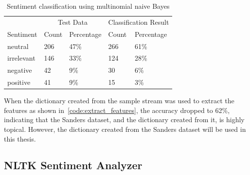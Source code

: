 \begin{table}
    \caption{Sentiment classification using multinomial naive Bayes}
    \label{tab:naive_bayes_results}
    \centering
    \begin{tabular}{lllll} %
        \toprule
        & \multicolumn{2}{c}{Test Data} & \multicolumn{2}{c}{Classification Result}\\
        \cmidrule{2-3}
        \cmidrule{4-5}
        Sentiment
        & Count
        & Percentage
        & Count
        & Percentage
        \\\midrule
        neutral & 206 & 47\%  & 266 & 61\%
        \\\midrule
        irrelevant & 146 & 33\%  & 124 & 28\%
        \\\midrule
        negative & 42 & 9\%   & 30 & 6\%
        \\\midrule
        positive & 41 & 9\%   & 15 & 3\%
        \\\bottomrule
    \end{tabular}
\end{table}

When the dictionary created from the sample stream was used to extract the features as shown in~\autoref{code:extract_features},
the accuracy dropped to 62\%, indicating that the Sanders dataset, and the dictionary created from it, is highly topical.
However, the dictionary created from the Sanders dataset will be used in this thesis.

\subsection{NLTK Sentiment Analyzer}
\label{subsec:nltksentimentanalyzer}


